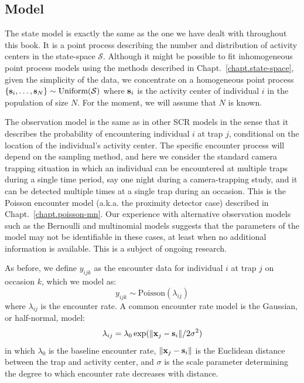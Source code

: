 
\subsection{Model}

The state model is exactly the same as the one we have dealt with
throughout
this book. It is a point process describing the number and distribution of
activity centers in the state-space $\mathcal{S}$. Although it might
be possible to fit inhomogeneous point process models using the
methods described in Chapt.~\ref{chapt.state-space},
given the simplicity of the data, we concentrate on a homogeneous point process
$\{{\bf s}_i, \ldots, {\bf s}_N\} \sim \text{Uniform}(\mathcal{S})$
where ${\bf s}_i$ is the activity center of individual $i$ in the
population of size $N$. For the moment, we will assume that $N$ is
known.

The observation model is the same as in other SCR models %
in the sense that it describes the probability of encountering individual
$i$ at trap $j$, conditional on the location of the individual's
activity center. The specific encounter process will depend on the
sampling method, and here we consider the standard camera trapping
situation in which an individual can be encountered at multiple traps
during a single time period, say one night during a camera-trapping
study, and it can be detected multiple times at a single trap during
an occasion. This is the Poisson encounter model (a.k.a. the proximity
detector case) described in Chapt.~\ref{chapt.poisson-mn}. Our
experience with alternative observation models such as the
Bernoulli and multinomial models
suggests that the parameters of the model may not be identifiable in
these cases, %
at least
when no additional information is available. This is a subject of
ongoing research.

As before, we define $y_{ijk}$ as the
encounter data for individual $i$ at trap $j$ on occasion $k$, which
we model as:
\begin{equation}
 y_{ijk} \sim \mbox{Poisson}(\lambda_{ij})
\label{eq.latentPoisson}
\end{equation}
where $\lambda_{ij}$ is the encounter rate. A common encounter rate model is the
Gaussian, or half-normal, model:
\[
\lambda_{ij} = \lambda_0 \exp(\| {\bf x}_j - {\bf s}_i \| / 2\sigma^2)
\]
in which $\lambda_0$ is the baseline encounter rate,
$\| {\bf x}_j - {\bf s}_i
\|$ is the Euclidean distance between the trap and activity center, and $\sigma$ is the
scale parameter determining the degree to which encounter rate decreases with
distance.

